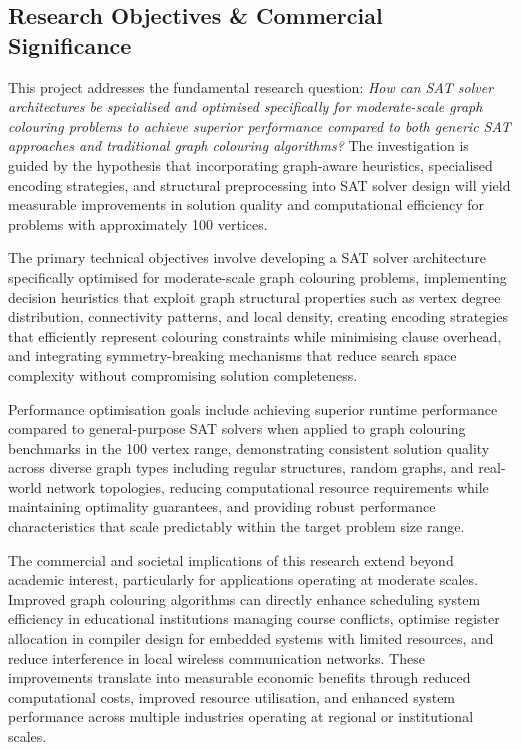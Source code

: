 \subsection{Research Objectives \& Commercial Significance}

This project addresses the fundamental research question: \textit{How can SAT solver architectures be specialised and optimised specifically for moderate-scale graph colouring problems to achieve superior performance compared to both generic SAT approaches and traditional graph colouring algorithms?} The investigation is guided by the hypothesis that incorporating graph-aware heuristics, specialised encoding strategies, and structural preprocessing into SAT solver design will yield measurable improvements in solution quality and computational efficiency for problems with approximately 100 vertices.

The primary technical objectives involve developing a SAT solver architecture specifically optimised for moderate-scale graph colouring problems, implementing decision heuristics that exploit graph structural properties such as vertex degree distribution, connectivity patterns, and local density, creating encoding strategies that efficiently represent colouring constraints while minimising clause overhead, and integrating symmetry-breaking mechanisms that reduce search space complexity without compromising solution completeness.

Performance optimisation goals include achieving superior runtime performance compared to general-purpose SAT solvers when applied to graph colouring benchmarks in the 100 vertex range, demonstrating consistent solution quality across diverse graph types including regular structures, random graphs, and real-world network topologies, reducing computational resource requirements while maintaining optimality guarantees, and providing robust performance characteristics that scale predictably within the target problem size range.

The commercial and societal implications of this research extend beyond academic interest, particularly for applications operating at moderate scales. Improved graph colouring algorithms can directly enhance scheduling system efficiency in educational institutions managing course conflicts, optimise register allocation in compiler design for embedded systems with limited resources, and reduce interference in local wireless communication networks. These improvements translate into measurable economic benefits through reduced computational costs, improved resource utilisation, and enhanced system performance across multiple industries operating at regional or institutional scales.


